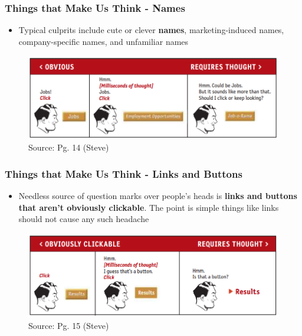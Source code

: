 \documentclass{beamer}
\begin{document}
\begin{frame}
	\frametitle{Things that Make Us Think - Names}
	\begin{itemize}
		\item Typical culprits include cute or clever \textbf{names}, marketing-induced names, company-specific names, and unfamiliar names
	\end{itemize}
	\centering
	\begin{figure}
		\includegraphics[width=0.8\linewidth]{steve/names}
		\caption{Source: Pg. 14 (Steve)}
	\end{figure}
\end{frame}

\begin{frame}
	\frametitle{Things that Make Us Think - Links and Buttons}
	\begin{itemize}
		\item Needless source of question marks over people's heads is \textbf{links and buttons that aren't obviously clickable}.  The point is simple things like links should not cause any such headache
	\end{itemize}
	\centering
	\begin{figure}
		\includegraphics[width=0.8\linewidth]{steve/links}
		\caption{Source: Pg. 15 (Steve)}
	\end{figure}
\end{frame}
\end{document}
